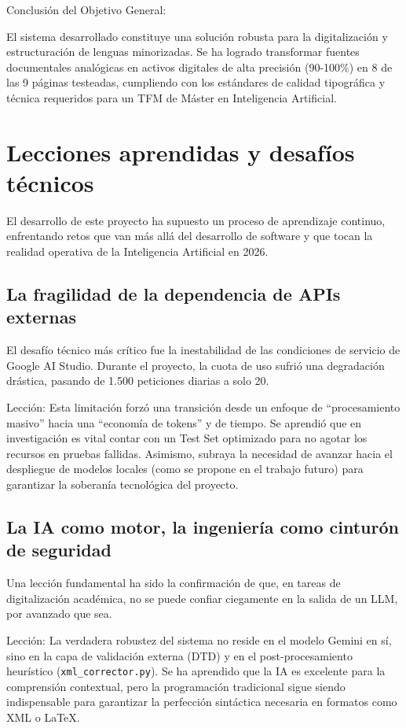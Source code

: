 Conclusión del Objetivo General:

El sistema desarrollado constituye una solución robusta para la digitalización y estructuración de lenguas minorizadas. Se ha logrado transformar fuentes documentales analógicas en activos digitales de alta precisión (90-100\%) en 8 de las 9 páginas testeadas, cumpliendo con los estándares de calidad tipográfica y técnica requeridos para un TFM de Máster en Inteligencia Artificial.

\section{Lecciones aprendidas y desafíos técnicos}

El desarrollo de este proyecto ha supuesto un proceso de aprendizaje continuo, enfrentando retos que van más allá del desarrollo de software y que tocan la realidad operativa de la Inteligencia Artificial en 2026.

\subsection{La fragilidad de la dependencia de APIs externas}

El desafío técnico más crítico fue la inestabilidad de las condiciones de servicio de Google AI Studio. Durante el proyecto, la cuota de uso sufrió una degradación drástica, pasando de 1.500 peticiones diarias a solo 20.

Lección: Esta limitación forzó una transición desde un enfoque de ``procesamiento masivo'' hacia una ``economía de tokens'' y de tiempo. Se aprendió que en investigación es vital contar con un Test Set optimizado para no agotar los recursos en pruebas fallidas. Asimismo, subraya la necesidad de avanzar hacia el despliegue de modelos locales (como se propone en el trabajo futuro) para garantizar la soberanía tecnológica del proyecto.

\subsection{La IA como motor, la ingeniería como cinturón de seguridad}

Una lección fundamental ha sido la confirmación de que, en tareas de digitalización académica, no se puede confiar ciegamente en la salida de un LLM, por avanzado que sea.

Lección: La verdadera robustez del sistema no reside en el modelo Gemini en sí, sino en la capa de validación externa (DTD) y en el post-procesamiento heurístico (\texttt{xml\_corrector.py}). Se ha aprendido que la IA es excelente para la comprensión contextual, pero la programación tradicional sigue siendo indispensable para garantizar la perfección sintáctica necesaria en formatos como XML o LaTeX.

